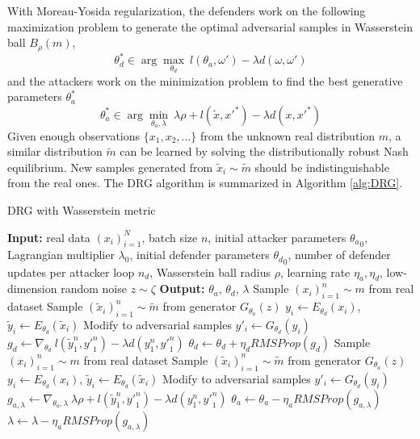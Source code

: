 \documentclass{article}
\begin{document}
With Moreau-Yosida regularization, the defenders work on the following maximization problem to generate the optimal adversarial samples in Wasserstein ball $B_\rho(m)$,
\begin{equation*}
\theta_d^* \in \arg\max_{\theta_d} \ l(\theta_a, \omega') - \lambda d(\omega,\omega')
\end{equation*}
and the attackers work on the minimization problem to find the best generative parameters $\theta_a^*$
\begin{equation*}
\theta_a^* \in \arg\min_{\theta_a,\lambda} \ \lambda \rho + l(\tilde{x}, x'^*) - \lambda d(x,x'^*)
\end{equation*}
Given enough observations $\{x_1, x_2, \ldots\}$ from the unknown real distribution $m$, a similar distribution $\tilde{m}$ can be learned by solving the distributionally robust Nash equilibrium. New samples generated from $\tilde{x}_i \sim \tilde{m}$ should be indistinguishable from the real ones.
The DRG algorithm is summarized in Algorithm \ref{alg:DRG}.
\begin{algorithm}
\caption{DRG with Wasserstein metric}
\label{alg:DRG}
\begin{algorithmic}
\STATE \textbf{Input:} real data $(x_i)_{i=1}^N$, batch size $n$, initial attacker parameters ${\theta_a}_0$, Lagrangian multiplier $\lambda_0$, initial defender parameters ${\theta_d}_0$, number of defender updates per attacker loop $n_d$, Wasserstein ball radius $\rho$, learning rate $\eta_a, \eta_d$, low-dimension random noise $z \sim \zeta$
\STATE \textbf{Output:} $\theta_a$, $\theta_d$, $\lambda$
\STATE Sample $(x_i)_{i=1}^n \sim m$ from real dataset
\STATE Sample $(\tilde{x}_i)_{i=1}^n \sim \tilde{m}$ from generator $G_{\theta_a}(z)$
\STATE $y_i \leftarrow E_{\theta_d}(x_i)$, \quad $\tilde{y}_i \leftarrow E_{\theta_d}(\tilde{x}_i)$
\STATE Modify to adversarial samples $y'_i \leftarrow G_{\theta_d}(y_i)$
\STATE $g_d \leftarrow \nabla_{\theta_d} \ l(\tilde{y}_1^n, {y'}_1^n) - \lambda d(y_1^n,{y'}_1^n)$
\STATE $\theta_d \leftarrow \theta_d + \eta_d RMSProp(g_d)$
\ENDFOR
\STATE Sample $(x_i)_{i=1}^n \sim m$ from real dataset
\STATE Sample $(\tilde{x}_i)_{i=1}^n \sim \tilde{m}$ from generator $G_{\theta_a}(z)$
\STATE $y_i \leftarrow E_{\theta_d}(x_i)$, \quad $\tilde{y}_i \leftarrow E_{\theta_d}(\tilde{x}_i)$
\STATE Modify to adversarial samples $y'_i \leftarrow G_{\theta_d}(y_i)$
\STATE $g_{a,\lambda} \leftarrow \nabla_{\theta_a, \lambda} \ \lambda \rho + l(\tilde{y}_1^n, {y'}_1^n) - \lambda d(y_1^n,{y'}_1^n)$
\STATE $\theta_a \leftarrow \theta_a - \eta_a RMSProp(g_{a,\lambda})$
\STATE $\lambda \leftarrow \lambda - \eta_a RMSProp(g_{a,\lambda})$
\ENDWHILE
\end{algorithmic}
\end{algorithm}
\end{document}
